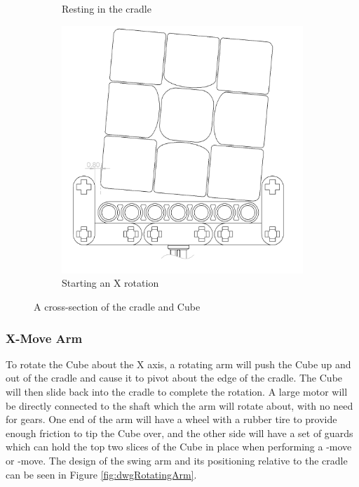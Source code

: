 \documentclass{report}
\newcommand{\move}[1]{\uppercase{\texttt{\formatmovesnospace{#1}}}-move}
\begin{document}
\begin{figure}[H]
\begin{subfigure}[b]{0.25\textwidth}
			\caption{Resting in the cradle}
			\label{fig:dwgCradleCurvedEdgeNormal}
		\end{subfigure}
		\hspace{10mm}
		\begin{subfigure}[b]{0.25\textwidth}
			\includegraphics[width=\textwidth]{Resources/Images/dwgCradleCurvedEdgeTilted.png}
			\caption{Starting an X rotation}
			\label{fig:dwgCradleCurvedEdgeTilted}
		\end{subfigure}
		\caption{A cross-section of the cradle and Cube}
		\label{fig:CradleDrawings}
	\end{figure}
    
    \subsubsection{X-Move Arm}
    
    To rotate the Cube about the X axis, a rotating arm will push the Cube up and out of the cradle and cause it to pivot about the edge of the cradle. The Cube will then slide back into the cradle to complete the rotation. A large motor will be directly connected to the shaft which the arm will rotate about, with no need for gears. One end of the arm will have a wheel with a rubber tire to provide enough friction to tip the Cube over, and the other side will have a set of guards which can hold the top two slices of the Cube in place when performing a \move{D} or \move{d'}. The design of the swing arm and its positioning relative to the cradle can be seen in Figure \ref{fig:dwgRotatingArm}.
    
\end{document}
